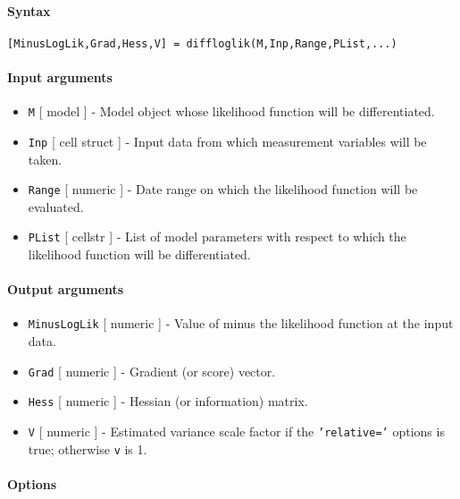 


	\paragraph{Syntax}

\begin{verbatim}
[MinusLogLik,Grad,Hess,V] = diffloglik(M,Inp,Range,PList,...)
\end{verbatim}

\paragraph{Input arguments}

\begin{itemize}
\item
  \texttt{M} {[} model {]} - Model object whose likelihood function will
  be differentiated.
\item
  \texttt{Inp} {[} cell \textbar{} struct {]} - Input data from which
  measurement variables will be taken.
\item
  \texttt{Range} {[} numeric {]} - Date range on which the likelihood
  function will be evaluated.
\item
  \texttt{PList} {[} cellstr {]} - List of model parameters with respect
  to which the likelihood function will be differentiated.
\end{itemize}

\paragraph{Output arguments}

\begin{itemize}
\item
  \texttt{MinusLogLik} {[} numeric {]} - Value of minus the likelihood
  function at the input data.
\item
  \texttt{Grad} {[} numeric {]} - Gradient (or score) vector.
\item
  \texttt{Hess} {[} numeric {]} - Hessian (or information) matrix.
\item
  \texttt{V} {[} numeric {]} - Estimated variance scale factor if the
  \texttt{'relative='} options is true; otherwise \texttt{v} is 1.
\end{itemize}

\paragraph{Options}

